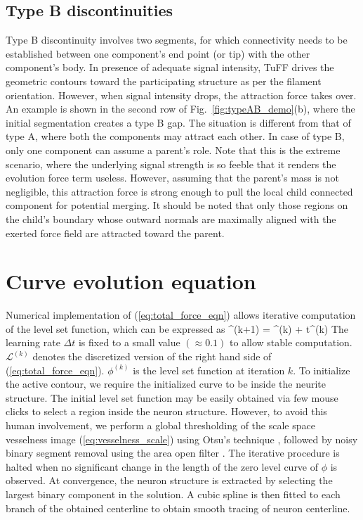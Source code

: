 \subsection{Type B discontinuities}
Type B discontinuity involves two segments, for which connectivity needs to be established between one component's end point (or tip) with the other component's body. In presence of adequate signal intensity, TuFF drives the geometric contours toward the participating structure as per the filament orientation. However, when signal intensity drops, the attraction force takes over. An example is shown in the second row of Fig.~\ref{fig:typeAB_demo}(b), where the initial segmentation creates a type B gap. The situation is different from that of type A, where both the components may attract each other. In case of type B, only one component can assume a parent's role. Note that this is the extreme scenario, where the underlying signal strength is so feeble that it renders the evolution force term useless. However, assuming that the parent's mass is not negligible, this attraction force is strong enough to pull the local child connected component for potential merging. It should be noted that only those regions on the child's boundary whose outward normals are maximally aligned with the exerted force field are attracted toward the parent. 

\section{Curve evolution equation}

Numerical implementation of (\ref{eq:total_force_eqn}) allows iterative computation of the level set function, which can be expressed as
\bea 
\phi^{(k+1)} = \phi^{(k)} + \Delta t^{(k)}
\eea
The learning rate $\Delta t$ is fixed to a small value $(\approx 0.1)$ to allow stable computation. $\mathcal{L}^{(k)}$ denotes the discretized version of the right hand side of (\ref{eq:total_force_eqn}). $\phi^{(k)}$ is the level set function at iteration $k$. 
To initialize the active contour, we require the initialized curve to be inside the neurite structure. The initial level set function may be easily obtained via few mouse clicks to select a region inside the neuron structure. However, to avoid this human involvement, we perform a global thresholding of the scale space vesselness image (\ref{eq:vesselness_scale}) using Otsu's technique \cite{otsu}, followed by noisy binary segment removal using the area open filter \cite{acton_fast}. The iterative procedure is halted when no significant change in the length of the zero level curve of $\phi$ is observed. At convergence, the neuron structure is extracted by selecting the largest binary component in the solution. A cubic spline is then fitted to each branch of the obtained centerline to obtain  smooth tracing of neuron centerline. 


